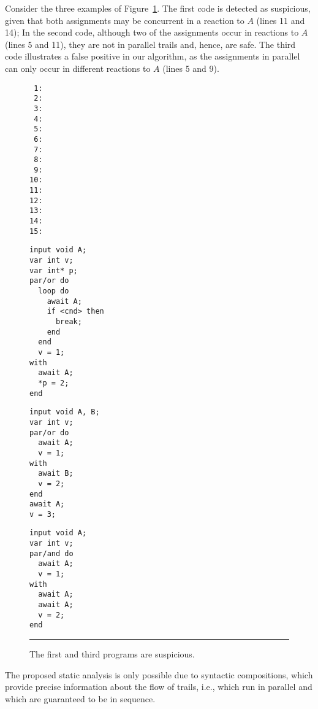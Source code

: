 \documentclass[10pt]{sensys-proc}
\begin{document}
Consider the three examples of Figure~\ref{lst.det}.
The first code is detected as suspicious, given that both assignments may be 
concurrent in a reaction to $A$ (lines 11 and 14);
In the second code, although two of the assignments occur in reactions to $A$ 
(lines 5 and 11), they are not in parallel trails and, hence, are safe.
The third code illustrates a false positive in our algorithm, as the 
assignments in parallel can only occur in different reactions to $A$ (lines 5 
and 9).

\begin{figure}[t]
\begin{minipage}[t]{0.05\linewidth}
{\small
\begin{verbatim}
 1:
 2:
 3:
 4:
 5:
 6:
 7:
 8:
 9:
10:
11:
12:
13:
14:
15:
\end{verbatim}
}
\end{minipage}
\hspace{0cm}
\begin{minipage}[t]{0.32\linewidth}
{\small
\begin{verbatim}
input void A;
var int v;
var int* p;
par/or do
  loop do
    await A;
    if <cnd> then
      break;
    end
  end
  v = 1;
with
  await A;
  *p = 2;
end
\end{verbatim}
}
\end{minipage}
\hspace{0cm}
\begin{minipage}[t]{0.29\linewidth}
{\small
\begin{verbatim}
input void A, B;
var int v;
par/or do
  await A;
  v = 1;
with
  await B;
  v = 2;
end
await A;
v = 3;
\end{verbatim}
}
\end{minipage}
\hspace{0cm}
\begin{minipage}[t]{0.25\linewidth}
{\small
\begin{verbatim}
input void A;
var int v;
par/and do
  await A;
  v = 1;
with
  await A;
  await A;
  v = 2;
end
\end{verbatim}
}
\end{minipage}
\rule{8.5cm}{0.37pt}
\caption{ The first and third programs are suspicious.
\label{lst.det}
}
\end{figure}

The proposed static analysis is only possible due to syntactic compositions, 
which provide precise information about the flow of trails, i.e., which run in 
parallel and which are guaranteed to be in sequence.
\end{document}
